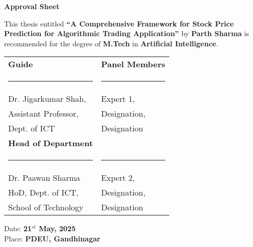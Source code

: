 \begin{center}
\textbf{\large Approval Sheet}
\end{center}

This thesis entitled \textbf{\enquote{A Comprehensive Framework for Stock Price Prediction for Algorithmic Trading Application}} by \textbf{Parth Sharma} is recommended for the degree of \textbf{M.Tech} in \textbf{Artificial Intelligence}.

\vspace{1cm}

\begin{table}[h!]
\centering
\begin{tabular}{@{}m{}<{\centering} m{}<{\centering}@{}}
\textbf{Guide} & \textbf{Panel Members} \\[4em]
\rule{0.4\textwidth}{0.4pt} & \rule{0.4\textwidth}{0.4pt} \\[1em]
Dr. Jigarkumar Shah, & Expert 1, \\[1em]
Assistant Professor, &  Designation, \\[1em]
Dept. of ICT &  Designation \\[2em]
\textbf{Head of Department} & \\ [4em]
\rule{0.4\textwidth}{0.4pt} & \rule{0.4\textwidth}{0.4pt} \\[1em]
Dr. Paawan Sharma & Expert 2, \\[1em]
HoD, Dept. of ICT, & Designation,\\[1em]
School of Technology & Designation\\[1em]
\end{tabular}
\end{table}

\vfill
\begin{flushleft}
    Date: \textbf{21$^{st}$ May, 2025}\\
    Place: \textbf{PDEU, Gandhinagar}\\    
\end{flushleft}